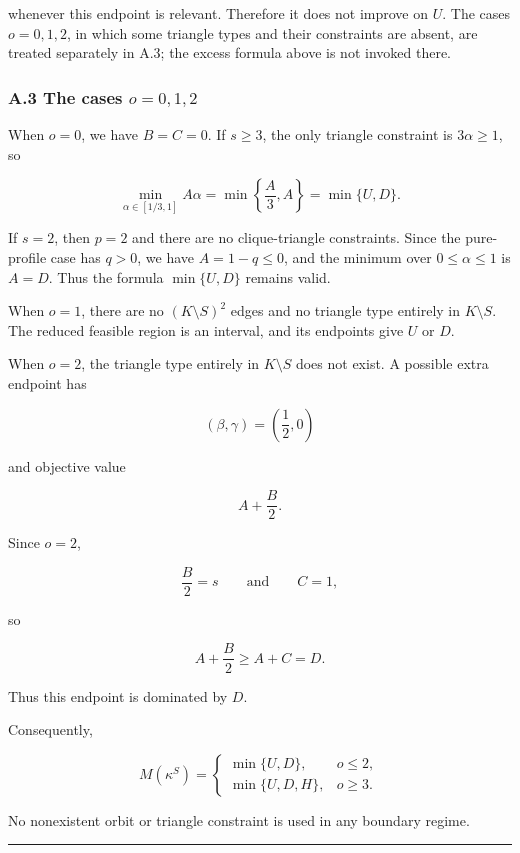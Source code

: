 \documentclass[english,11pt,a4paper]{article}
\newcounter{none}
\begin{document}
whenever this endpoint is relevant. Therefore it does not improve on
\(U\). The cases \(o=0,1,2\), in which some triangle types and their
constraints are absent, are treated separately in A.3; the excess
formula above is not invoked there.

\subsubsection{\texorpdfstring{A.3 The cases
\(o=0,1,2\)}{A.3 The cases o=0,1,2}}\label{a.3-the-cases-o012}

When \(o=0\), we have \(B=C=0\). If \(s\ge3\), the only triangle
constraint is \(3\alpha\ge1\), so

\[
\min_{\alpha\in[1/3,1]}A\alpha
=
\min\left\{\frac A3,A\right\}
=
\min\{U,D\}.
\]

If \(s=2\), then \(p=2\) and there are no clique-triangle constraints.
Since the pure-profile case has \(q>0\), we have \(A=1-q\le0\), and the
minimum over \(0\le\alpha\le1\) is \(A=D\). Thus the formula
\(\min\{U,D\}\) remains valid.

When \(o=1\), there are no \((K\setminus S)^2\) edges and no triangle
type entirely in \(K\setminus S\). The reduced feasible region is an
interval, and its endpoints give \(U\) or \(D\).

When \(o=2\), the triangle type entirely in \(K\setminus S\) does not
exist. A possible extra endpoint has

\[
(\beta,\gamma)=\left(\frac12,0\right)
\]

and objective value

\[
A+\frac B2.
\]

Since \(o=2\),

\[
\frac B2=s
\qquad\text{and}\qquad
C=1,
\]

so

\[
A+\frac B2\ge A+C=D.
\]

Thus this endpoint is dominated by \(D\).

Consequently,

\[
M(\kappa^S)
=
\begin{cases}
\min\{U,D\},&o\le2,\\[1mm]
\min\{U,D,H\},&o\ge3.
\end{cases}
\]

No nonexistent orbit or triangle constraint is used in any boundary
regime.

\begin{center}\rule{0.5\linewidth}{0.5pt}\end{center}
\end{document}
